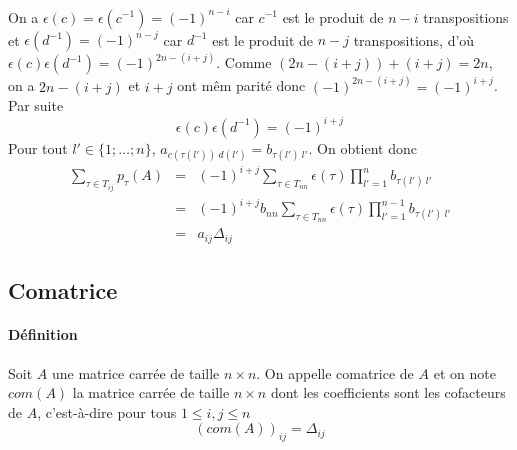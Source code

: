 On a $\epsilon(c) = \epsilon(c^{-1}) = (-1)^{n-i}$ car $c^{-1}$ est le produit de $n-i$ transpositions et $\epsilon(d^{-1}) = (-1)^{n-j}$ car $d^{-1}$ est le produit de $n-j$ transpositions, d'où $\epsilon(c) \epsilon(d^{-1}) = (-1)^{2n - (i+j)}$. Comme $(2n - (i+j)) + (i+j) = 2n$, on a $2n - (i+j)$ et $i+j$ ont mêm parité donc $(-1)^{2n - (i+j)} = (-1)^{i+j}$. Par suite
$$\epsilon(c) \epsilon(d^{-1}) = (-1)^{i+j}$$
Pour tout $l' \in \{1; \ldots; n \}$, $a_{c(\tau(l')) ~ d(l')} = b_{\tau(l') ~ l'}$. On obtient donc
\begin{eqnarray*}
  \sum_{\tau \in T_{ij}} p_{\tau}(A) &=& (-1)^{i+j} \sum_{\tau \in T_{nn}} \epsilon(\tau) \prod_{l'=1}^{n} b_{\tau(l') ~ l'} \\
    &=& (-1)^{i+j} b_{nn} \sum_{\tau \in T_{nn}} \epsilon(\tau) \prod_{l' = 1}^{n-1} b_{\tau(l') ~ l'} \\
    &=& a_{ij} \Delta_{ij}
\end{eqnarray*}

%
\subsection{Comatrice}
%
\paragraph{Définition} Soit $A$ une matrice carrée de taille $n \times n$. On appelle comatrice de $A$ et on note $com(A)$ la matrice carrée de taille $n \times n$ dont les coefficients sont les cofacteurs de $A$, c'est-à-dire pour tous $1 \leq i, j \leq n$
$$(com(A))_{ij} = \Delta_{ij}$$

